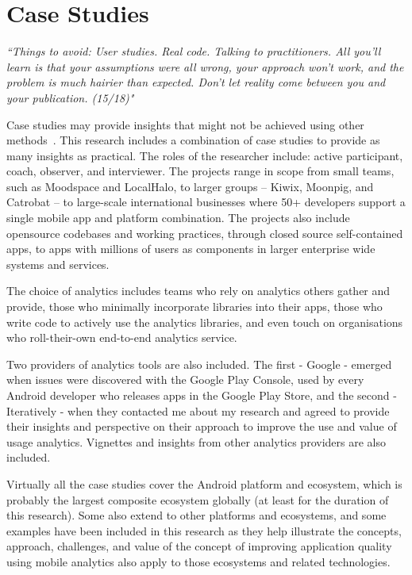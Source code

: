\chapter{Case Studies}
\label{chapter-case-studies}

\emph{``Things to avoid: User studies. Real code. Talking to practitioners. All you'll learn is that your assumptions were all wrong, your approach won't work, and the problem is much hairier than expected. Don't let reality come between you and your publication. (15/18)"}~\citep{zeller2021_tweet_the_devils_guide_to_incremental_research_15_18}

Case studies may provide insights that might not be achieved using other methods~\citep{rowley2002_using_case_studies_in_research}. This research includes a combination of case studies to provide as many insights as practical. The roles of the researcher include: active participant, coach, observer, and interviewer. The projects range in scope from small teams, such as Moodspace and LocalHalo, to larger groups -- Kiwix, Moonpig, and Catrobat -- to large-scale international businesses where 50+ developers support a single mobile app and platform combination. The projects also include opensource codebases and working practices, through closed source self-contained apps, to apps with millions of users as components in larger enterprise wide systems and services.

The choice of analytics includes teams who rely on analytics others gather and provide, those who minimally incorporate libraries into their apps, those who write code to actively use the analytics libraries, and even touch on organisations who roll-their-own end-to-end analytics service.

Two providers of analytics tools are also included. The first - Google - emerged when issues were discovered with the Google Play Console, used by every Android developer who releases apps in the Google Play Store, and the second - Iteratively - when they contacted me about my research and agreed to provide their insights and perspective on their approach to improve the use and value of usage analytics. Vignettes and insights from other analytics providers are also included. 

Virtually all the case studies cover the Android platform and ecosystem, which is probably the largest composite ecosystem globally (at least for the duration of this research). Some also extend to other platforms and ecosystems, and some examples have been included in this research as they help illustrate the concepts, approach, challenges, and value of the concept of improving application quality using mobile analytics also apply to those ecosystems and related technologies.

